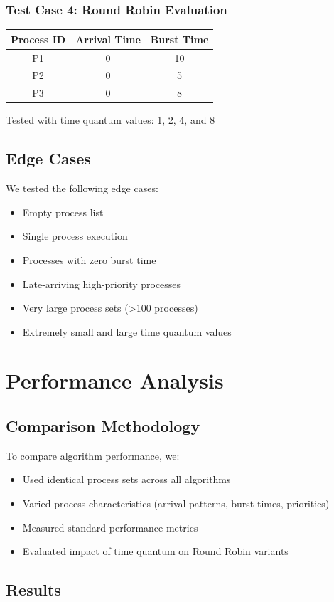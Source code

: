 \documentclass[12pt,a4paper]{report}
\begin{document}
\subsection{Test Case 4: Round Robin Evaluation}
\begin{tabular}{|c|c|c|}
\hline
Process ID & Arrival Time & Burst Time \\
\hline
P1 & 0 & 10 \\
P2 & 0 & 5 \\
P3 & 0 & 8 \\
\hline
\end{tabular}
Tested with time quantum values: 1, 2, 4, and 8

\section{Edge Cases}
We tested the following edge cases:
\begin{itemize}
    \item Empty process list
    \item Single process execution
    \item Processes with zero burst time
    \item Late-arriving high-priority processes
    \item Very large process sets (>100 processes)
    \item Extremely small and large time quantum values
\end{itemize}

\chapter{Performance Analysis}

\section{Comparison Methodology}
To compare algorithm performance, we:
\begin{itemize}
    \item Used identical process sets across all algorithms
    \item Varied process characteristics (arrival patterns, burst times, priorities)
    \item Measured standard performance metrics
    \item Evaluated impact of time quantum on Round Robin variants
\end{itemize}

\section{Results}
\end{document}
